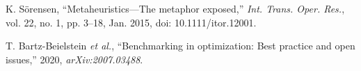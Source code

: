 K. S\"orensen, ``Metaheuristics---The metaphor exposed,'' \textit{Int. Trans. Oper. Res.}, vol. 22, no. 1, pp. 3--18, Jan. 2015, doi: 10.1111/itor.12001.

T. Bartz-Beielstein \textit{et al.}, ``Benchmarking in optimization: Best practice and open issues,'' 2020, \textit{arXiv:2007.03488}.
